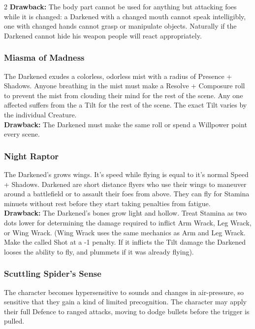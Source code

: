 \begin{multicols}{2}
\noindent \textbf{Drawback:} The body part cannot be used for anything but attacking foes while it is changed: a Darkened with a changed mouth cannot speak intelligibly, one with changed hands cannot grasp or manipulate objects. Naturally if the Darkened cannot hide his weapon people will react appropriately. 

\subsubsection*{Miasma of Madness}
The Darkened exudes a colorless, odorless mist with a radius of Presence + Shadows. Anyone breathing in the mist must make a Resolve + Composure roll to prevent the mist from clouding their mind for the rest of the scene. Any one affected suffers from the a Tilt for the rest of the scene. The exact Tilt varies by the individual Creature. \\

\noindent \textbf{Drawback:} The Darkened must make the same roll or spend a Willpower point every scene. 

\subsubsection*{Night Raptor}
The Darkened's grows wings. It's speed while flying is equal to it's normal Speed + Shadows. Darkened are short distance flyers who use their wings to maneuver around a battlefield or to assault their foes from above. They can fly for Stamina minuets without rest before they start taking penalties from fatigue. \\

\noindent \textbf{Drawback:} The Darkened's bones grow light and hollow. Treat Stamina as two dots lower for determining the damage required to inflict Arm Wrack, Leg Wrack, or Wing Wrack. (Wing Wrack uses the same mechanics as Arm and Leg Wrack. Make the called Shot at a -1 penalty. If it inflicts the Tilt damage the Darkened looses the ability to fly, and plummets if it was already flying).

\subsubsection*{Scuttling Spider's Sense}

The character becomes hypersensitive to sounds and changes in air-pressure, so sensitive that they gain a kind of limited precognition. The character may apply their full Defence to ranged attacks, moving to dodge bullets before the trigger is pulled. \\


\end{multicols}
